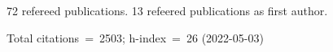 72 refereed publications. 13 refeered publications as first author.

Total citations~=~2503; h-index~=~26 (2022-05-03)